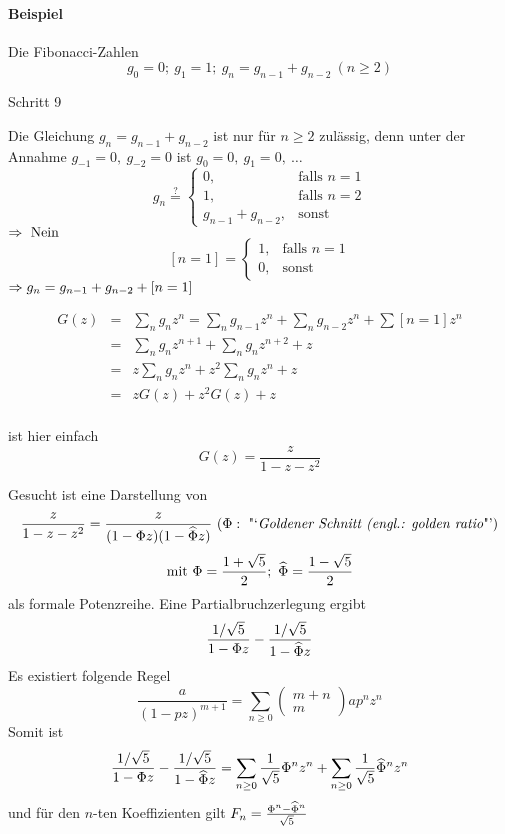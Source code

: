 \documentclass[a4paper,twoside,DIV15,BCOR12mm]{scrbook}
\begin{document}
\paragraph{Beispiel} Die Fibonacci-Zahlen
$$g_0=0;\ g_1=1;\ g_n=g_{n-1}+g_{n-2}\ (n \geq 2)$$

\begin{labeling}[:]{Schritt 9}
\item[Schritt 1] Die Gleichung $g_n=g_{n-1}+g_{n-2}$ ist nur für $n \geq 2$ zulässig, denn unter der Annahme $g_{-1}=0,\ g_{-2}=0$ ist
      $g_0=0,\ g_1=0,\ \ldots$
      \[
      	g_n \stackrel{?}{=} \begin{cases}
      	0,& \text{falls $n=1$} \\
      	1,& \text{falls $n=2$} \\
      	g_{n-1}+g_{n-2},& \text{sonst}
      \end{cases}\]
      $\Rightarrow \text{ Nein}$
      \[ \left[ n=1 \right] =
      \begin{cases}
      	1,& \text{falls $n=1$} \\
      	0,& \text{sonst}
      \end{cases}\]
      $\Rightarrow g_n=g_{n-1}+g_{n-2} + \left[ n=1 \right]$
\item[Schritt 2]
	\begin{eqnarray*}
			G(z) & = & \sum_ng_nz^n = \sum_ng_{n-1}z^n + \sum_ng_{n-2}z^n + \sum [n=1]z^n \\
			     & = & \sum_ng_nz^{n+1} + \sum_ng_nz^{n+2} + z \\
			     & = & z\sum_ng_nz^n + z^2\sum_ng_nz^n + z \\
			     & = & zG(z) + z^2G(z) + z \\
	\end{eqnarray*}
\item[Schritt 3] ist hier einfach
      $$G(z) = \frac{z}{1-z-z^2}$$
\item[Schritt 4] Gesucht ist eine Darstellung von      
      $$\frac{z}{1-z-z^2}=\frac{z}{(1-\Phi z)(1-\widehat{\Phi}z)}\ (\Phi: \text{ "`\textit{Goldener Schnitt (engl.: golden ratio}"'})$$
			$$\text{mit }\Phi = \frac{1+\sqrt{5}}{2};\ \widehat{\Phi} = \frac{1-\sqrt{5}}{2}$$
			als formale Potenzreihe. Eine Partialbruchzerlegung ergibt			
			$$\frac{1/\sqrt{5}}{1-\Phi z} - \frac{1/\sqrt{5}}{1-\widehat{\Phi}z}$$
			Es existiert folgende Regel
			$$\frac{a}{(1-pz)^{m+1}} = \sum_{n \geq 0} \left(\begin{array}{c}m+n\\m\end{array}\right)ap^nz^n$$
			Somit ist 
			$$\frac{1/\sqrt{5}}{1-\Phi z} - \frac{1/\sqrt{5}}{1-\widehat{\Phi}z} = 
			\sum_{n \geq 0}\frac{1}{\sqrt{5}}\Phi^nz^n + \sum_{n \geq 0}\frac{1}{\sqrt{5}}\widehat{\Phi}^nz^n$$
			und für den $n$-ten Koeffizienten gilt
			$F_n = \frac{\Phi^n - \widehat{\Phi}^n}{\sqrt{5}}$
\end{labeling}
\end{document}
